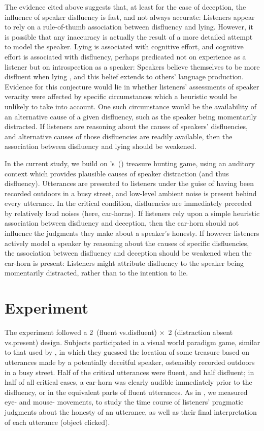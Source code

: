 \documentclass[a4paper,man,natbib]{apa6}
\newcommand*{\citegen}[1]{\citeauthor{#1}'s~(\citeyear{#1})}
\begin{document}
The evidence cited above suggests that, at least for the case of deception, the influence of speaker disfluency is fast, and not always accurate: 
Listeners appear to rely on a rule-of-thumb association between disfluency and lying.
However, it is possible that any inaccuracy is actually the result of a more detailed attempt to model the speaker.
Lying is associated with cognitive effort, and cognitive effort is associated with disfluency, perhaps predicated not on experience as a listener but on introspection as a speaker:
Speakers believe themselves to be more disfluent when lying \citep{Zuckerman1981}, and this belief extends to others' language production.
Evidence for this conjecture would lie in whether listeners' assessments of speaker veracity were affected by specific circumstances which a heuristic would be unlikely to take into account.
One such circumstance would be the availability of an alternative cause of a given disfluency, such as the speaker being momentarily distracted.
If listeners are reasoning about the causes of speakers' disfluencies, and alternative causes of those disfluencies are readily available, then the association between disfluency and lying should be weakened.


In the current study, we build on \citegen{Loy2016} treasure hunting game, using an auditory context which provides plausible causes of speaker distraction (and thus disfluency).
Utterances are presented to listeners under the guise of having been recorded outdoors in a busy street, and low-level ambient noise is present behind every utterance.
In the critical condition, disfluencies are immediately preceded by relatively loud noises (here, car-horns).
If listeners rely upon a simple heuristic association between disfluency and deception, then the car-horn should not influence the judgments they make about a speaker's honesty.
If however listeners actively model a speaker by reasoning about the causes of specific disfluencies, the association between disfluency and deception should be weakened when the car-horn is present:
Listeners might attribute disfluency to the speaker being momentarily distracted, rather than to the intention to lie.


\section{Experiment}

The experiment followed a 2~(fluent vs.\@ disfluent) $\times$~2 (distraction absent vs.\@ present) design.
Subjects participated in a visual world paradigm game, similar to that used by \citet{Loy2016}, in which they guessed the location of some treasure based on utterances made by a potentially deceitful speaker, ostensibly recorded outdoors in a busy street.
Half of the critical utterances were fluent, and half disfluent; in half of all critical cases, a car-horn was clearly audible immediately prior to the disfluency, or in the equivalent parts of fluent utterances.
As in \citet{Loy2016}, we measured eye- and mouse- movements, to study the time course of listeners' pragmatic judgments about the honesty of an utterance, as well as their final interpretation of each utterance (object clicked).
\end{document}
